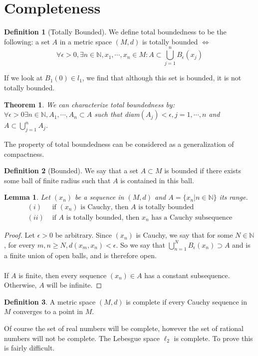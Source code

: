 \documentclass{article}
\newtheorem{theorem}{Theorem}[section]
\newtheorem{lemma}{Lemma}[section]
\theoremstyle{definition}
\newtheorem{definition}{Definition}[section]
\begin{document}
\section{Completeness}
    \begin{mdframed}
        \begin{definition}[Totally Bounded]
            We define total boundedness to be the following: a set $A$ in a metric space $(M,d)$ is totally bounded $\Leftrightarrow$
            \[
                \forall \epsilon > 0, \exists n \in \mathbb{N}, x_1, \cdots , x_n \in M : A \subset \bigcup_{j=1}^n B_\epsilon(x_j)
            \]
        \end{definition}
    \end{mdframed}
    If we look at $B_1(0) \in l_1$, we find that although this set is bounded, it is not totally bounded.
    \begin{mdframed}
        \begin{theorem}
            We can characterize total boundedness by: $\forall \epsilon > 0 \exists n \in \mathbb{N}, A_1, \cdots, A_n \subset A$ such that diam$(A_j) < \epsilon, j = 1, \cdots, n$ and $A \subset \bigcup_{j=1}^n A_j$.
        \end{theorem}
    \end{mdframed}
    The property of total boundedness can be considered as a generalization of compactness.
    \begin{definition}[Bounded]
        We say that a set $A \subset M$ is bounded if there exists some ball of finite
        radius such that $A$ is contained in this ball.
    \end{definition}
    \begin{lemma} Let $(x_n)$ be a sequence in $(M,d)$ and $A = \{x_n | n \in \mathbb{N}\}$ its range.
        \begin{align*}
            (i) & \text{ if $(x_n)$ is Cauchy, then $A$ is totally bounded}\\
            (ii) & \text{ if $A$ is totally bounded, then $x_n$ has a Cauchy subsequence}
        \end{align*}
    \end{lemma}
    \begin{proof}
         Let $\epsilon > 0$ be arbitrary. Since $(x_n)$ is Cauchy,
        we say that for some $N \in \mathbb{N}$, for every $m,n \geq N, d(x_m, x_n) < \epsilon$.
        So we say that $\bigcup_{n=1}^N B_\epsilon(x_n) \supset A$ and is a finite union of open
        balls, and is therefore open.\\\\
        If $A$ is finite, then every sequence $(x_n) \in A$ has a constant subsequence. Otherwise,
        $A$ will be infinite.
    \end{proof}
    \begin{definition}
        A metric space $(M,d)$ is complete if every Cauchy sequence in $M$ converges to a point in $M$.
    \end{definition}
    Of course the set of real numbers will be complete, however the set of rational numbers will not be complete.
    The Lebesgue space $\ell_2$ is complete. To prove this is fairly difficult.
\end{document}
